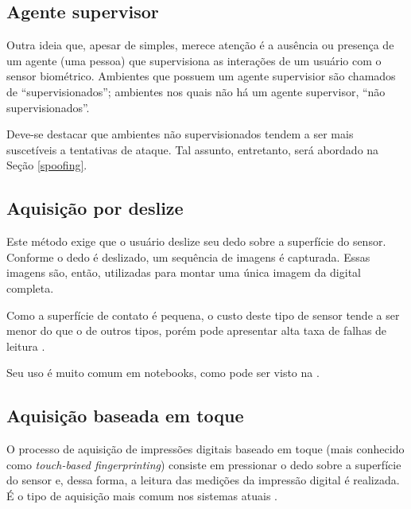\subsection{Agente supervisor}
Outra ideia que, apesar de simples, merece atenção é a ausência ou presença de um agente (uma pessoa) que supervisiona as interações de um usuário com o sensor biométrico. Ambientes que possuem um agente supervisior são chamados de ``supervisionados''; ambientes nos quais não há um agente supervisor, ``não supervisionados''.

Deve-se destacar que ambientes não supervisionados tendem a ser mais suscetíveis a tentativas de ataque. Tal assunto, entretanto, será abordado na Seção \ref{spoofing}.

\subsection{Aquisição por deslize} \label{swipe}
Este método exige que o usuário deslize seu dedo sobre a superfície do sensor. Conforme o dedo é deslizado, um sequência de imagens é capturada. Essas imagens são, então, utilizadas para montar uma única imagem da digital completa.

Como a superfície de contato é pequena, o custo deste tipo de sensor tende a ser menor do que o de outros tipos, porém pode apresentar alta taxa de falhas de leitura \cite{presentation_attack_survey}.

Seu uso é muito comum em notebooks, como pode ser visto na .

%

\subsection{Aquisição baseada em toque} \label{touch}
O processo de aquisição de impressões digitais baseado em toque (mais conhecido como \textit{touch-based fingerprinting}) consiste em pressionar o dedo sobre a superfície do sensor e, dessa forma, a leitura das medições da impressão digital é realizada. É o tipo de aquisição mais comum nos sistemas atuais \cite{2D_3D_survey}.

